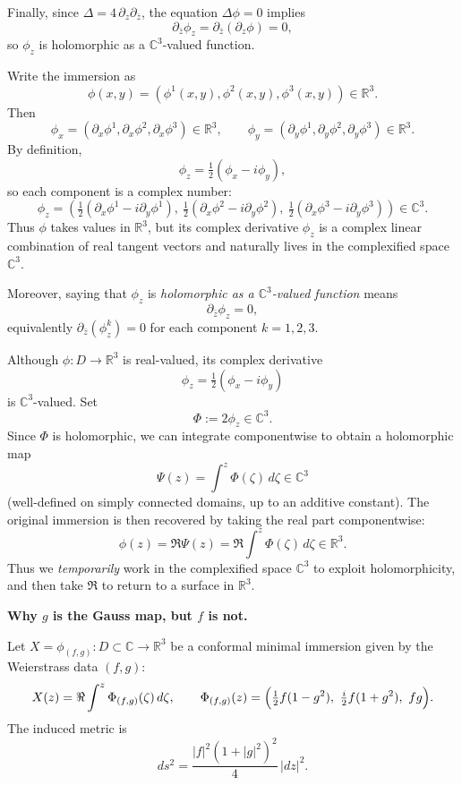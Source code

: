 \begin{problem}[CP-IV-0089]
Finally, since $\Delta = 4\,\partial_z\partial_{\bar z}$, the equation $\Delta\phi=0$ implies
\[
\partial_{\bar z}\phi_z=\partial_{\bar z}(\partial_z\phi)=0,
\]
so $\phi_z$ is holomorphic as a $\mathbb C^3$-valued function.

\medskip

Write the immersion as
\[
\phi(x,y)=(\phi^1(x,y),\phi^2(x,y),\phi^3(x,y))\in\mathbb R^3.
\]
Then
\[
\phi_x=(\partial_x\phi^1,\partial_x\phi^2,\partial_x\phi^3)\in\mathbb R^3,
\qquad
\phi_y=(\partial_y\phi^1,\partial_y\phi^2,\partial_y\phi^3)\in\mathbb R^3.
\]
By definition,
\[
\phi_z=\tfrac12(\phi_x-i\phi_y),
\]
so each component is a complex number:
\[
\phi_z=
\left(
\tfrac12(\partial_x\phi^1-i\partial_y\phi^1),\
\tfrac12(\partial_x\phi^2-i\partial_y\phi^2),\
\tfrac12(\partial_x\phi^3-i\partial_y\phi^3)
\right)\in\mathbb C^3.
\]
Thus $\phi$ takes values in $\mathbb R^3$, but its complex derivative $\phi_z$ is a complex linear combination of real
tangent vectors and naturally lives in the complexified space $\mathbb C^3$.

Moreover, saying that $\phi_z$ is \emph{holomorphic as a $\mathbb C^3$-valued function} means
\[
\partial_{\bar z}\phi_z=0,
\]
equivalently $\partial_{\bar z}(\phi_z^k)=0$ for each component $k=1,2,3$.

\medskip

Although $\phi:D\to\mathbb R^3$ is real-valued, its complex derivative
\[
\phi_z=\tfrac12(\phi_x-i\phi_y)
\]
is $\mathbb C^3$-valued. Set
\[
\Phi:=2\phi_z \in \mathbb C^3.
\]
Since $\Phi$ is holomorphic, we can integrate componentwise to obtain a holomorphic map
\[
\Psi(z)=\int^z \Phi(\zeta)\,d\zeta \in \mathbb C^3
\]
(well-defined on simply connected domains, up to an additive constant). The original immersion is then recovered by taking
the real part componentwise:
\[
\phi(z)=\Re \Psi(z)=\Re\int^z \Phi(\zeta)\,d\zeta \in \mathbb R^3.
\]
Thus we \emph{temporarily} work in the complexified space $\mathbb C^3$ to exploit holomorphicity, and then take $\Re$ to
return to a surface in $\mathbb R^3$.

	\medskip
	\textbf{Why $g$ is the Gauss map, but $f$ is not.}

	Let $X=\phi_{(f,g)}:D\subset\mathbb C\to\mathbb R^3$ be a conformal minimal immersion given by the Weierstrass data $(f,g)$:
	\[
	X(z)=\Re\int^z \Phi_{(f,g)}(\zeta)\,d\zeta,
	\qquad
	\Phi_{(f,g)}(z)
	=
	\Bigl(\tfrac12 f(1-g^2),\ \tfrac{i}{2}f(1+g^2),\ fg\Bigr).
	\]
	The induced metric is
	\[
	ds^2=\frac{|f|^2(1+|g|^2)^2}{4}\,|dz|^2.
	\]


\end{problem}
